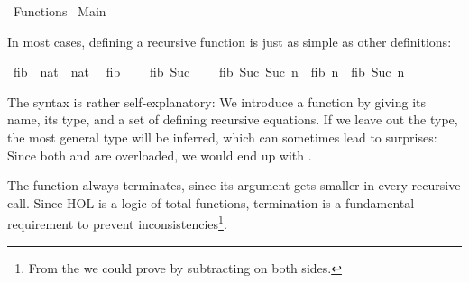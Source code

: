 %
\begin{isabellebody}%
\def\isabellecontext{Functions}%
%
\isadelimtheory
\isanewline
\isanewline
%
\endisadelimtheory
%
\isatagtheory
{}\isamarkupfalse%
\ Functions\isanewline
{}\ Main\isanewline
{}%
\endisatagtheory
{\isafoldtheory}%
%
\isadelimtheory
%
\endisadelimtheory
%
\isamarkuptrue%
%
\begin{isamarkuptext}%
In most cases, defining a recursive function is just as simple as other definitions:%
\end{isamarkuptext}%
\isamarkuptrue%
\isamarkupfalse%
\ fib\ {\isacharcolon}{\isacharcolon}\ {\isachardoublequoteopen}nat\ {\isasymRightarrow}\ nat{\isachardoublequoteclose}\isanewline
{}\isanewline
\ \ {\isachardoublequoteopen}fib\ {}\ {\isacharequal}\ {}{\isachardoublequoteclose}\isanewline
{\isacharbar}\ {\isachardoublequoteopen}fib\ {\isacharparenleft}Suc\ {}{\isacharparenright}\ {\isacharequal}\ {}{\isachardoublequoteclose}\isanewline
{\isacharbar}\ {\isachardoublequoteopen}fib\ {\isacharparenleft}Suc\ {\isacharparenleft}Suc\ n{\isacharparenright}{\isacharparenright}\ {\isacharequal}\ fib\ n\ {\isacharplus}\ fib\ {\isacharparenleft}Suc\ n{\isacharparenright}{\isachardoublequoteclose}%
\begin{isamarkuptext}%
The syntax is rather self-explanatory: We introduce a function by
  giving its name, its type, 
  and a set of defining recursive equations.
  If we leave out the type, the most general type will be
  inferred, which can sometimes lead to surprises: Since both  and  are overloaded, we would end up
  with .%
\end{isamarkuptext}%
\isamarkuptrue%
%
\begin{isamarkuptext}%
The function always terminates, since its argument gets smaller in
  every recursive call. 
  Since HOL is a logic of total functions, termination is a
  fundamental requirement to prevent inconsistencies\footnote{From the
    we could prove 
   by subtracting  on both sides.}.

\end{isamarkuptext}
\end{isabellebody}
